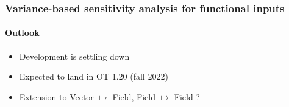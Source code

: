 \documentclass[aspectratio=169]{beamer}
\begin{document}
% 
% 
% 
% 
% 
% 
% 
% 
% 
% 
% 
% 
% 


\begin{frame}[containsverbatim]
\frametitle{Variance-based sensitivity analysis for functional inputs}

\framesubtitle{Outlook}

\begin{itemize}
\item Development is settling down
\item Expected to land in OT 1.20 (fall 2022)
\item Extension to Vector $\mapsto$ Field, Field $\mapsto$ Field ?
\end{itemize}

\end{frame}
\end{document}
